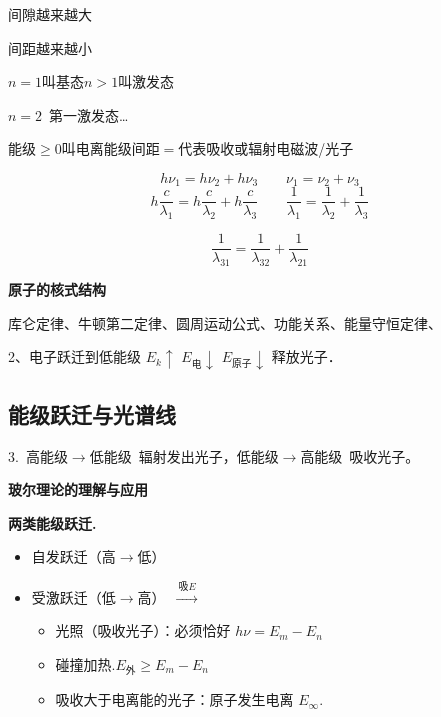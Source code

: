间隙越来越大 %


间距越来越小 %

$n=1$叫基态\quad $n>1$叫激发态

$n=2$\ 第一激发态…

能级$\ge0$叫电离\qquad 能级间距$=$代表吸收或辐射电磁波/光子

\[
h\nu_1=h\nu_2+h\nu_3\qquad \nu_1=\nu_2+\nu_3 %
\]
\[
h\frac{c}{\lambda_1}=h\frac{c}{\lambda_2}+h\frac{c}{\lambda_3}\qquad \frac{1}{\lambda_1}=\frac{1}{\lambda_2}+\frac{1}{\lambda_3}
\]

\[
\frac{1}{\lambda_{31}}=\frac{1}{\lambda_{32}}+\frac{1}{\lambda_{21}}
\]

\textbf{原子的核式结构}

库仑定律、牛顿第二定律、圆周运动公式、功能关系、能量守恒定律、

2、电子跃迁到低能级 $E_k\uparrow$ $E_{\text{电}}\downarrow$ $E_{\text{原子}}\downarrow$ 释放光子．%

\subsection{能级跃迁与光谱线}
3.\ 高能级$\to$低能级\ 辐射发出光子，低能级$\to$高能级\ 吸收光子。

\textbf{玻尔理论的理解与应用}

\textbf{两类能级跃迁.} %
\begin{itemize}
\item 自发跃迁（高$\to$低）
\item 受激跃迁（低$\to$高）\ $\xrightarrow{\ \text{吸}E\ }$
  \begin{itemize}
  \item 光照（吸收光子）：必须恰好 $h\nu=E_m-E_n$
  \item 碰撞加热.\quad $E_{\text{外}}\ge E_m-E_n$
  \item 吸收大于电离能的光子：原子发生电离 $E_\infty$.
  \end{itemize}
\end{itemize}

